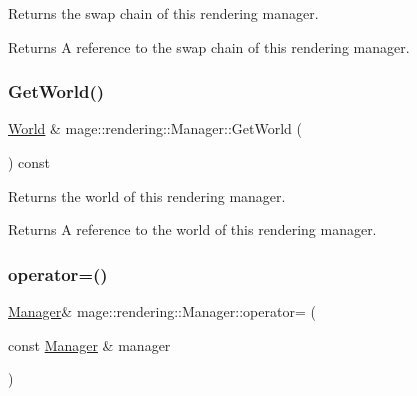 Returns the swap chain of this rendering manager.

\begin{DoxyReturn}{Returns}
A reference to the swap chain of this rendering manager. 
\end{DoxyReturn}
\hypertarget{classmage_1_1rendering_1_1_manager_a526b7c2db1a219e9b3bd4286e039696d}{}\label{classmage_1_1rendering_1_1_manager_a526b7c2db1a219e9b3bd4286e039696d} 
\subsubsection{\texorpdfstring{Get\+World()}{GetWorld()}}
{\footnotesize\ttfamily \hyperlink{classmage_1_1rendering_1_1_world}{World} \& mage\+::rendering\+::\+Manager\+::\+Get\+World (\begin{DoxyParamCaption}{ }\end{DoxyParamCaption}) const\hspace{0.3cm}{\ttfamily [noexcept]}}

Returns the world of this rendering manager.

\begin{DoxyReturn}{Returns}
A reference to the world of this rendering manager. 
\end{DoxyReturn}
\hypertarget{classmage_1_1rendering_1_1_manager_acbc8c70a805b9f82268dd0391aa96e44}{}\label{classmage_1_1rendering_1_1_manager_acbc8c70a805b9f82268dd0391aa96e44} 
\subsubsection{\texorpdfstring{operator=()}{operator=()}\hspace{0.1cm}{\footnotesize\ttfamily [1/2]}}
{\footnotesize\ttfamily \hyperlink{classmage_1_1rendering_1_1_manager}{Manager}\& mage\+::rendering\+::\+Manager\+::operator= (\begin{DoxyParamCaption}\item[{const \hyperlink{classmage_1_1rendering_1_1_manager}{Manager} \&}]{manager }\end{DoxyParamCaption})\hspace{0.3cm}{\ttfamily [delete]}}

